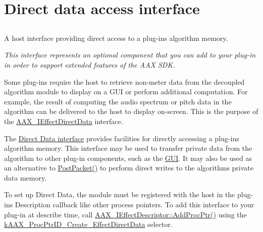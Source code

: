 \hypertarget{a00333}{}\section{Direct data access interface}
\label{a00333}


\subsection{ }
A host interface providing direct access to a plug-\/in\textquotesingle{}s algorithm memory. 

{\itshape This interface represents an optional component that you can add to your plug-\/in in order to support extended features of the A\+A\+X S\+D\+K.}

Some plug-\/ins require the host to retrieve non-\/meter data from the decoupled algorithm module to display on a G\+U\+I or perform additional computation. For example, the result of computing the audio spectrum or pitch data in the algorithm can be delivered to the host to display on-\/screen. This is the purpose of the \hyperlink{a00097}{A\+A\+X\+\_\+\+I\+Effect\+Direct\+Data} interface.

The \hyperlink{a00097}{Direct Data interface} provides facilities for directly accessing a plug-\/in\textquotesingle{}s algorithm memory. This interface may be used to transfer private data from the algorithm to other plug-\/in components, such as the \hyperlink{a00329}{G\+U\+I}. It may also be used as an alternative to \hyperlink{a00090_ae5dd2b5925dbc181513bca1c4ac5e716}{Post\+Packet()} to perform direct writes to the algorithm\textquotesingle{}s private data memory.

To set up Direct Data, the module must be registered with the host in the plug-\/in\textquotesingle{}s Description callback like other process pointers. To add this interface to your plug-\/in at describe time, call \hyperlink{a00096_ad1a286ef7cb869e6f79423dd774ec976}{A\+A\+X\+\_\+\+I\+Effect\+Descriptor\+::\+Add\+Proc\+Ptr()} using the \hyperlink{a00163_af0682195d377392ad356fd2b00c36892a2d3621474e9eeeda84309dad0a4d8d8e}{k\+A\+A\+X\+\_\+\+Proc\+Ptr\+I\+D\+\_\+\+Create\+\_\+\+Effect\+Direct\+Data} selector.

